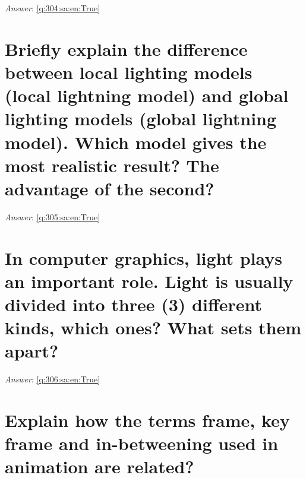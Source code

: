 \documentclass[a4paper,11pt,oneside]{book}
\begin{document}
\begin{sloppypar}
\label{q:304:sa:en:False}

\vspace{2cm}

\noindent\makebox[\textwidth]{\hrulefill}

\vspace{1cm}

\textit{Answer}: \autoref{q:304:sa:en:True}



\section{Briefly explain the difference between local lighting models (local lightning model) and global lighting models (global lightning model). Which model gives the most realistic result? The advantage of the second?}

\label{q:305:sa:en:False}

\vspace{2cm}

\noindent\makebox[\textwidth]{\hrulefill}

\vspace{1cm}

\textit{Answer}: \autoref{q:305:sa:en:True}



\section{In computer graphics, light plays an important role. Light is usually divided into three (3) different kinds, which ones? What sets them apart?}

\label{q:306:sa:en:False}

\vspace{2cm}

\noindent\makebox[\textwidth]{\hrulefill}

\vspace{1cm}

\textit{Answer}: \autoref{q:306:sa:en:True}



\section{Explain how the terms frame, key frame and in-betweening used in animation are related?}

\label{q:307:sa:en:False}

\vspace{2cm}


\end{sloppypar}
\end{document}
